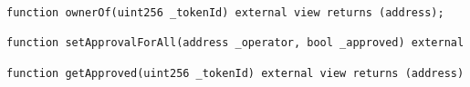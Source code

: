 \begin{lstlisting}[language=Solidity]
function ownerOf(uint256 _tokenId) external view returns (address);

function setApprovalForAll(address _operator, bool _approved) external

function getApproved(uint256 _tokenId) external view returns (address)
\end{lstlisting}